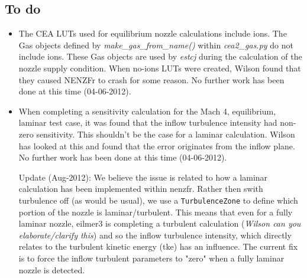 \subsection{To do}
\label{nenzfr_to_do}
\begin{itemize}
\item The CEA LUTs used for equilibrium nozzle calculations include ions. The Gas objects defined by \textit{make\_gas\_from\_name()} within \textit{cea2\_gas.py} do not include ions. These Gas objects are used by \textit{estcj} during the calculation of the nozzle supply condition. When no-ions LUTs were created, Wilson found that they caused NENZFr to crash for some reason. No further work has been done at this time (04-06-2012).
\item When completing a sensitivity calculation for the Mach 4, equilibrium, laminar test case, it was found that the inflow turbulence intensity had non-zero sensitivity. This shouldn't be the case for a laminar calculation. Wilson has looked at this and found that the error originates from the inflow plane. No further work has been done at this time (04-06-2012).

Update (Aug-2012): We believe the issue is related to how a laminar calculation has been implemented within nenzfr. Rather then swith turbulence off (as would be usual), we use a \texttt{TurbulenceZone} to define which portion of the nozzle is laminar/turbulent. This means that even for a fully laminar nozzle, eilmer3 is completing a turbulent calculation (\textit{Wilson can you elaborate/clarify this}) and so the inflow turbulence intensity, which directly relates to the turbulent kinetic energy (tke) has an influence. The current fix is to force the inflow turbulent parameters to "zero" when a fully laminar nozzle is detected.
\end{itemize}

